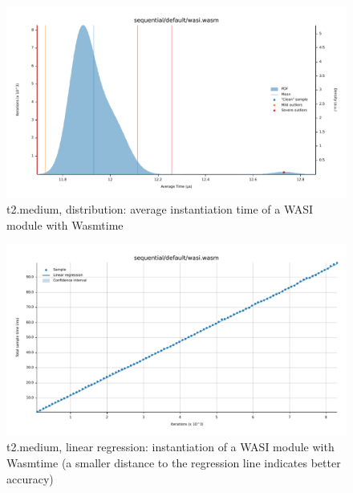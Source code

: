\begin{figure}[H]
    \centering
        \includegraphics[width=1\linewidth]{images/benches/t2_medium_sequential_default_wasi.pdf}
    \caption{t2.medium, distribution: average instantiation time of a WASI module with Wasmtime}
    \label{fig:bench:t2-instantiation:wasi}
\end{figure}

\begin{figure}[H]
    \centering
        \includegraphics[width=1\linewidth]{images/benches/t2_medium_regression_default_wasi.pdf}
    \caption{t2.medium, linear regression: instantiation of a WASI module with Wasmtime (a smaller distance to the regression line indicates better accuracy)}
    \label{fig:bench:t2-regression-instantiation:wasi}
\end{figure}

